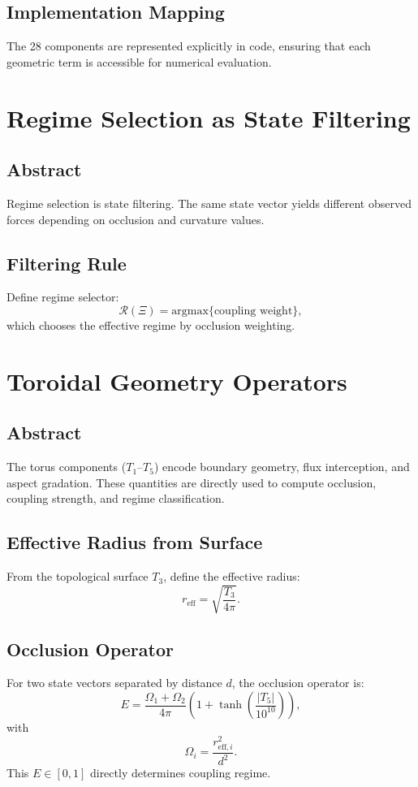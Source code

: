 \documentclass[12pt]{book}
\begin{document}
\section{Implementation Mapping}
The 28 components are represented explicitly in code, ensuring that each geometric term is accessible for
numerical evaluation.

\chapter{Regime Selection as State Filtering}

\section*{Abstract}
Regime selection is state filtering. The same state vector yields different observed forces depending on
occlusion and curvature values.

\section{Filtering Rule}
Define regime selector:
\begin{equation}
\mathcal{R}(\Xi) = \text{argmax}\{\text{coupling weight}\},
\end{equation}
which chooses the effective regime by occlusion weighting.

\chapter{Toroidal Geometry Operators}

\section*{Abstract}
The torus components ($T_1$–$T_5$) encode boundary geometry, flux interception, and aspect gradation.
These quantities are directly used to compute occlusion, coupling strength, and regime classification.

\section{Effective Radius from Surface}
From the topological surface $T_3$, define the effective radius:
\begin{equation}
r_{\text{eff}} = \sqrt{\frac{T_3}{4\pi}}.
\end{equation}

\section{Occlusion Operator}
For two state vectors separated by distance $d$, the occlusion operator is:
\begin{equation}
E = \frac{\Omega_1 + \Omega_2}{4\pi}\left(1 + \tanh\left(\frac{|T_5|}{10^{10}}\right)\right),
\end{equation}
with
\begin{equation}
\Omega_i = \frac{r_{\text{eff},i}^2}{d^2}.
\end{equation}
This $E \in [0,1]$ directly determines coupling regime.
\end{document}
